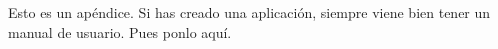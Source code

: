 \documentclass[a4paper, 12pt]{book}
\begin{document}
Esto es un apéndice.
Si has creado una aplicación, siempre viene bien tener un manual de usuario.
Pues ponlo aquí.


\cleardoublepage


\end{document}
